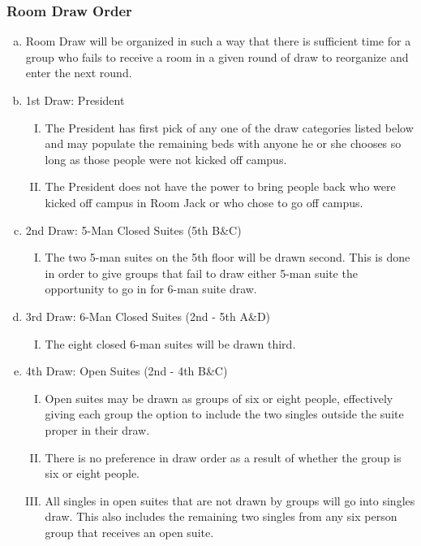 \documentclass[USletter,12pt]{article}
\begin{document}
\subsubsection{Room Draw Order}
\begin{enumerate}[(a)]
\item Room Draw will be organized in such a way that there is sufficient time for a group who fails to receive a room in a given round of draw to reorganize and enter the next round.
\item 1st Draw: President
	\begin{enumerate}[(I)]
	\item The President has first pick of any one of the draw categories listed below and may populate the remaining beds with anyone he or she chooses so long as those people were not kicked off campus.
	\item The President does not have the power to bring people back who were kicked off campus in Room Jack or who chose to go off campus.
	\end{enumerate}
\item 2nd Draw: 5-Man Closed Suites (5th B\&C)
	\begin{enumerate}[(I)]
	\item The two 5-man suites on the 5th floor will be drawn second.  This is done in order to give groups that fail to draw either 5-man suite the opportunity to go in for 6-man suite draw.
	\end{enumerate}
\item 3rd Draw: 6-Man Closed Suites (2nd - 5th A\&D)
	\begin{enumerate}[(I)]
	\item The eight closed 6-man suites will be drawn third.
	\end{enumerate}
\item 4th Draw: Open Suites (2nd - 4th B\&C)
	\begin{enumerate}[(I)]
	\item Open suites may be drawn as groups of six or eight people, effectively giving each group the option to include the two singles outside the suite proper in their draw.
	\item There is no preference in draw order as a result of whether the group is six or eight people.
	\item All singles in open suites that are not drawn by groups will go into singles draw. This also includes the remaining two singles from any six person group that receives an open suite.
	\end{enumerate}

\end{enumerate}
\end{document}
